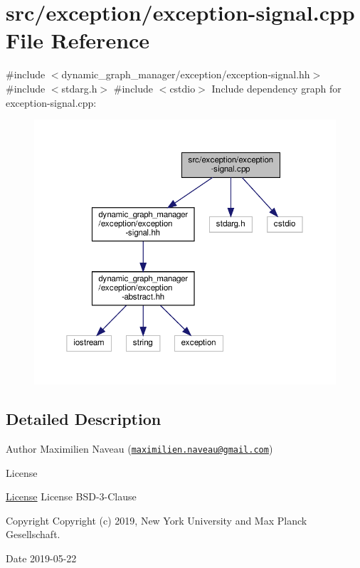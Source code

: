 \hypertarget{exception-signal_8cpp}{}\section{src/exception/exception-\/signal.cpp File Reference}
\label{exception-signal_8cpp}
{\ttfamily \#include $<$dynamic\+\_\+graph\+\_\+manager/exception/exception-\/signal.\+hh$>$}\newline
{\ttfamily \#include $<$stdarg.\+h$>$}\newline
{\ttfamily \#include $<$cstdio$>$}\newline
Include dependency graph for exception-\/signal.cpp\+:
\nopagebreak
\begin{figure}[H]
\begin{center}
\leavevmode
\includegraphics[width=350pt]{exception-signal_8cpp__incl}
\end{center}
\end{figure}


\subsection{Detailed Description}
\begin{DoxyAuthor}{Author}
Maximilien Naveau (\href{mailto:maximilien.naveau@gmail.com}{\tt maximilien.\+naveau@gmail.\+com}) 
\end{DoxyAuthor}
\begin{DoxyRefDesc}{License}
\item[\hyperlink{license__license000048}{License}]License B\+S\+D-\/3-\/\+Clause \end{DoxyRefDesc}
\begin{DoxyCopyright}{Copyright}
Copyright (c) 2019, New York University and Max Planck Gesellschaft. 
\end{DoxyCopyright}
\begin{DoxyDate}{Date}
2019-\/05-\/22 
\end{DoxyDate}

